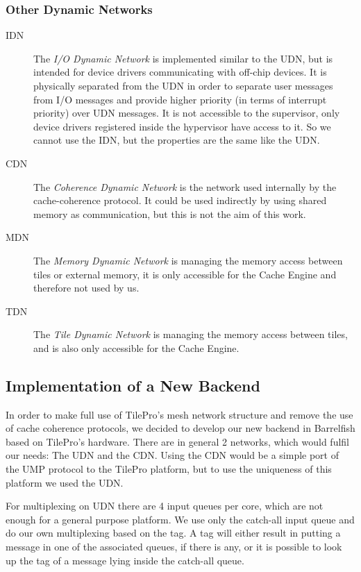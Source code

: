 \documentclass[a4paper,twoside]{report} %
\begin{document}
\subsubsection{Other Dynamic Networks}
\begin{description}
	\item[IDN] The \emph{I/O Dynamic Network} is implemented similar to the UDN, but is intended for device drivers communicating with off-chip devices. It is physically separated from the UDN in order to separate user messages from I/O messages and provide higher priority (in terms of interrupt priority) over UDN messages. It is not accessible to the supervisor, only device drivers registered inside the hypervisor have access to it. So we cannot use the IDN, but the properties are the same like the UDN.
	\item[CDN] The \emph{Coherence Dynamic Network} is the network used internally by the cache-coherence protocol. It could be used indirectly by using shared memory as communication, but this is not the aim of this work.
	\item[MDN] The \emph{Memory Dynamic Network} is managing the memory access between tiles or external memory, it is only accessible for the Cache Engine and therefore not used by us.
	\item[TDN] The \emph{Tile Dynamic Network} is managing the memory access between tiles, and is also only accessible for the Cache Engine.
\end{description}

\subsection{Implementation of a New Backend}
In order to make full use of TilePro's mesh network structure and remove the use of cache coherence protocols, we decided to develop our new backend in Barrelfish based on TilePro's hardware. There are in general 2 networks, which would fulfil our needs: The UDN and the CDN. Using the CDN would be a simple port of the UMP protocol to the TilePro platform, but to use the uniqueness of this platform we used the UDN.

For multiplexing on UDN there are 4 input queues per core, which are not enough for a general purpose platform. We use only the catch-all input queue and do our own multiplexing based on the tag. A tag will either result in putting a message in one of the associated queues, if there is any, or it is possible to look up the tag of a message lying inside the catch-all queue. 
\end{document}
